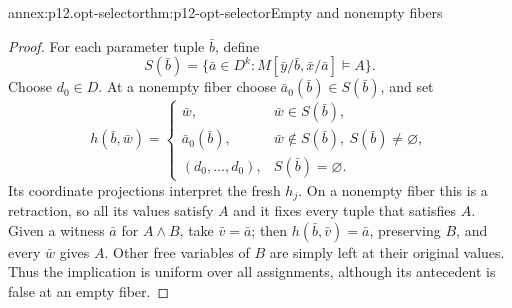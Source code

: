 \begin{annexitem}{annex:p12.opt-selector}{thm:p12-opt-selector}{Empty and nonempty fibers}
\begin{proof}
For each parameter tuple \(\bar b\), define
\[
 S(\bar b)=\{\bar a\in D^k:M[\bar y/\bar b,\bar x/\bar a]\models A\}.
\]
Choose \(d_0\in D\). At a nonempty fiber choose
\(\bar a_0(\bar b)\in S(\bar b)\), and set
\[
 h(\bar b,\bar w)=
 \begin{cases}
 \bar w,&\bar w\in S(\bar b),\\
 \bar a_0(\bar b),&\bar w\notin S(\bar b),\ S(\bar b)\ne\varnothing,\\
 (d_0,\ldots,d_0),&S(\bar b)=\varnothing.
 \end{cases}
\]
Its coordinate projections interpret the fresh \(h_j\).
On a nonempty fiber this is a retraction, so all its values satisfy
\(A\) and it fixes every tuple that satisfies \(A\).
Given a witness \(\bar a\) for \(A\land B\), take
\(\bar v=\bar a\); then \(h(\bar b,\bar v)=\bar a\), preserving
\(B\), and every \(\bar w\) gives \(A\).
Other free variables of \(B\) are simply left at their original
values. Thus the implication is uniform over all assignments,
although its antecedent is false at an empty fiber.
\end{proof}
\end{annexitem}

